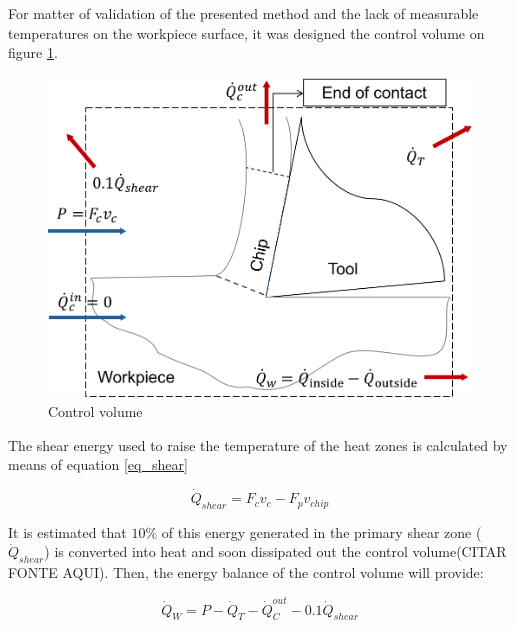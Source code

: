 	For matter of validation of the presented method and the lack of measurable temperatures on the workpiece surface, it was designed the control volume on figure \ref{fig:volControl}.

	\begin{figure}[H]
		\centering
		\captionsetup{justification=centering}
		\includegraphics[scale=0.6]{Imagens/volumeControl.png}
		\caption{Control volume}
		\label{fig:volControl}
	\end{figure}

	The shear energy used to raise the temperature of the heat zones is calculated by means of equation \ref{eq_shear}

	\begin{equation} 
	\label{eq_shear}
	\dot{Q}_{shear} = F_{c}v_{c} - F_{p}v_{chip}
	\end{equation}

	It is estimated that $10\%$ of this energy generated in the primary shear zone ($\dot{Q}_{shear}$) is converted into heat and soon dissipated out the control volume(CITAR FONTE AQUI). Then, the energy balance of the control volume will provide:

	\begin{equation} 
	\label{eq_energybalance}
	\dot{Q}_{W} = P - \dot{Q}_{T} - \dot{Q}_{C}^{out} - 0.1\dot{Q}_{shear}
	\end{equation}
